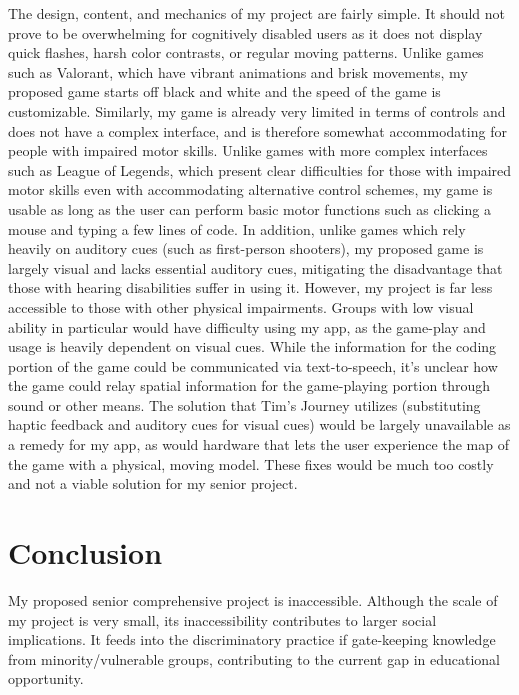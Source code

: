 \documentclass[10pt,twocolumn]{article}
\begin{document}
    The design, content, and mechanics of my project are fairly simple. It should not prove to be overwhelming for cognitively disabled users as it does not display quick flashes, harsh color contrasts, or regular moving patterns. Unlike games such as Valorant, which have vibrant animations and brisk movements, my proposed game starts off black and white and the speed of the game is customizable. Similarly, my game is already very limited in terms of controls and does not have a complex interface, and is therefore somewhat accommodating for people with impaired motor skills. Unlike games with more complex interfaces such as League of Legends, which present clear difficulties for those with impaired motor skills even with accommodating alternative control schemes, my game is usable as long as the user can perform basic motor functions such as clicking a mouse and typing a few lines of code. In addition, unlike games which rely heavily on auditory cues (such as first-person shooters), my proposed game is largely visual and lacks essential auditory cues, mitigating the disadvantage that those with hearing disabilities suffer in using it.
    However, my project is far less accessible to those with other physical impairments. Groups with low visual ability in particular would have difficulty using my app, as the game-play and usage is heavily dependent on visual cues. While the information for the coding portion of the game could be communicated via text-to-speech, it's unclear how the game could relay spatial information for the game-playing portion through sound or other means. The solution that Tim's Journey utilizes (substituting haptic feedback and auditory cues for visual cues) would be largely unavailable as a remedy for my app, as would hardware that lets the user experience the map of the game with a physical, moving model. These fixes would be much too costly and not a viable solution for my senior project.


\section{Conclusion}
    My proposed senior comprehensive project is inaccessible. Although the scale of my project is very small, its inaccessibility contributes to larger social implications. It feeds into the discriminatory practice if gate-keeping knowledge from minority/vulnerable groups, contributing to the current gap in educational opportunity.

\printbibliography 
\end{document}

